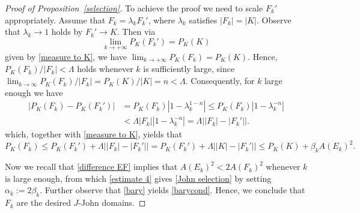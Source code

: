 \documentclass[reqno,11pt]{amsart}
\def\bint{{\ifinner\rlap{\bf\kern.35em--}
\int\else\rlap{\bf\kern.45em--}\int\fi}\ignorespaces}
\numberwithin{equation}{section}
\theoremstyle{remark}
\def\bint{{\ifinner\rlap{\bf\kern.35em--}
\int\else\rlap{\bf\kern.45em--}\int\fi}\ignorespaces}
\begin{document}
\begin{proof}[Proof of Proposition~\ref{selection}]
To achieve the proof we need to scale $F_k'$ appropriately. Assume that $F_k=\lambda_k F_k'$, where $\lambda_k$ satisfies $|F_k|=|K|$. Observe that $\lambda_k\to 1$ holds by  $F_k'\to K$. Then via $$\lim_{k\to +\infty}P_K(F_k')=P_K(K) $$
given by  \eqref{measure to K}, we have $\lim_{k\to +\infty}P_K(F_k)=P_K(K) $. Hence, $P_K(F_k)/|F_k|<\Lambda$ holds whenever $k$ is sufficiently large, since $\lim_{k\to \infty}P_K(F_k)/|F_k|=P_K(K)/|K|=n<\Lambda$. 
Consequently, for $k$ large enough we have 
\begin{align}\label{estimate 3}
    |P_K(F_k)-P_K(F_k')|& =P_K(F_k)|1-\lambda_k^{1-n}|\le P_K(F_k)|1-\lambda_k^{-n}|\nonumber\\
    & <\Lambda|F_k| |1-\lambda_k^{-n}|= \Lambda \big||F_k|-|F_k'|\big|.
\end{align}
which, together with  \eqref{measure to K}, yields that 
\begin{equation}\label{estimate 4}
    P_K(F_k)\le P_K(F_k')
+\Lambda \big||F_k|-|F_k'|\big|= P_K(F_k')
+\Lambda \big||K|-|F_k'|\big|\le P_K(K)+\beta_k A(E_k)^2. 
\end{equation}

Now  we recall that \eqref{difference EF}
implies that $A(E_k)^2< 2A(F_k)^2 $  whenever $k$ is large enough, from which \eqref{estimate 4} gives \eqref{John selection} by setting $\alpha_k:=2\beta_k$. Further observe that  \eqref{bary} yields \eqref{barycond}. Hence,  we  conclude that $F_k$ are the desired $J$-John domains. 
\end{proof}



\end{document}
